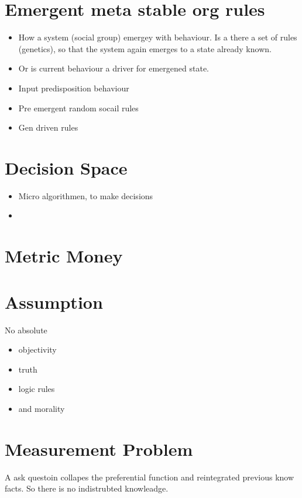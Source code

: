 \section{Emergent meta stable org rules}
\begin{itemize}
	\item How a system (social group) emergey with behaviour. Is a there a set of rules (genetics), so that the system again emerges to a state already known.
	\item Or is current behaviour a driver for emergened state.
	\item Input predisposition behaviour
	\item Pre emergent random socail rules
	\item Gen driven rules
\end{itemize}

\section{Decision Space}
\begin{itemize}
	\item Micro algorithmen, to make decisions
	\item 
\end{itemize}

\section{Metric Money}
\section{Assumption}
No absolute
\begin{itemize}
	\item objectivity
	\item truth
	\item logic rules
	\item and morality
\end{itemize}

\section{Measurement Problem}

A ask questoin collapes the preferential function and reintegrated previous know facts. So there is no indistrubted knowleadge.